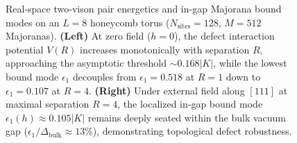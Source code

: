 \begin{figure}[t]
\caption{Real-space two-vison pair energetics and in-gap Majorana bound modes on an $L = 8$ honeycomb torus ($N_{\mathrm{sites}} = 128$, $M = 512$ Majoranas). \textbf{(Left)} At zero field ($h = 0$), the defect interaction potential $V(R)$ increases monotonically with separation $R$, approaching the asymptotic threshold $\sim 0.168 |K|$, while the lowest bound mode $\epsilon_1$ decouples from $\epsilon_1 = 0.518$ at $R=1$ down to $\epsilon_1 = 0.107$ at $R=4$. \textbf{(Right)} Under external field along $[111]$ at maximal separation $R = 4$, the localized in-gap bound mode $\epsilon_1(h) \approx 0.105 |K|$ remains deeply seated within the bulk vacuum gap ($\epsilon_1 / \Delta_{\mathrm{bulk}} \approx 13\%$), demonstrating topological defect robustness.}
\label{fig:f20_vortex_energetics}
\end{figure}
